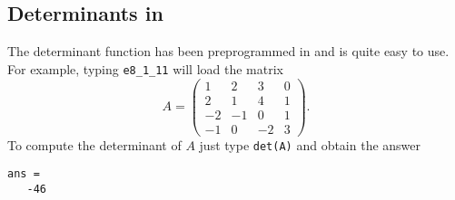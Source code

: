 \subsection*{Determinants in \Matlab}

The determinant function has been preprogrammed in \Matlab and
is quite easy to use.  For example, typing {\tt e8\_1\_11} will
load the matrix
\begin{equation*}  \label{e:A4x4}
A = \left(\begin{array}{rrrr}
     1   &  2  &   3  &   0\\
     2   &  1  &   4  &   1\\
    -2   & -1  &   0  &   1\\
    -1   &  0  &  -2  &   3  \end{array} \right).
\end{equation*}
To compute the determinant of $A$ just type {\tt det(A)} and
obtain the answer 
\begin{verbatim}
ans =
   -46
\end{verbatim}

